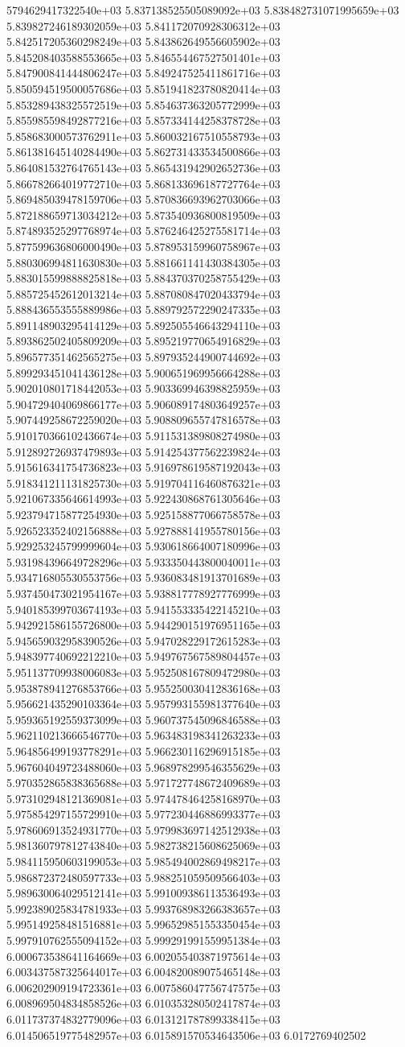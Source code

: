5794629417322540e+03	5.837138525505089092e+03	5.838482731071995659e+03	5.839827246189302059e+03	5.841172070928306312e+03	5.842517205360298249e+03	5.843862649556605902e+03	5.845208403588553665e+03	5.846554467527501401e+03	5.847900841444806247e+03	5.849247525411861716e+03	5.850594519500057686e+03	5.851941823780820414e+03	5.853289438325572519e+03	5.854637363205772999e+03	5.855985598492877216e+03	5.857334144258378728e+03	5.858683000573762911e+03	5.860032167510558793e+03	5.861381645140284490e+03	5.862731433534500866e+03	5.864081532764765143e+03	5.865431942902652736e+03	5.866782664019772710e+03	5.868133696187727764e+03	5.869485039478159706e+03	5.870836693962703066e+03	5.872188659713034212e+03	5.873540936800819509e+03	5.874893525297768974e+03	5.876246425275581714e+03	5.877599636806000490e+03	5.878953159960758967e+03	5.880306994811630830e+03	5.881661141430384305e+03	5.883015599888825818e+03	5.884370370258755429e+03	5.885725452612013214e+03	5.887080847020433794e+03	5.888436553555889986e+03	5.889792572290247335e+03	5.891148903295414129e+03	5.892505546643294110e+03	5.893862502405809209e+03	5.895219770654916829e+03	5.896577351462565275e+03	5.897935244900744692e+03	5.899293451041436128e+03	5.900651969956664288e+03	5.902010801718442053e+03	5.903369946398825959e+03	5.904729404069866177e+03	5.906089174803649257e+03	5.907449258672259020e+03	5.908809655747816578e+03	5.910170366102436674e+03	5.911531389808274980e+03	5.912892726937479893e+03	5.914254377562239824e+03	5.915616341754736823e+03	5.916978619587192043e+03	5.918341211131825730e+03	5.919704116460876321e+03	5.921067335646614993e+03	5.922430868761305646e+03	5.923794715877254930e+03	5.925158877066758578e+03	5.926523352402156888e+03	5.927888141955780156e+03	5.929253245799999604e+03	5.930618664007180996e+03	5.931984396649728296e+03	5.933350443800040011e+03	5.934716805530553756e+03	5.936083481913701689e+03	5.937450473021954167e+03	5.938817778927776999e+03	5.940185399703674193e+03	5.941553335422145210e+03	5.942921586155726800e+03	5.944290151976951165e+03	5.945659032958390526e+03	5.947028229172615283e+03	5.948397740692212210e+03	5.949767567589804457e+03	5.951137709938006083e+03	5.952508167809472980e+03	5.953878941276853766e+03	5.955250030412836168e+03	5.956621435290103364e+03	5.957993155981377640e+03	5.959365192559373099e+03	5.960737545096846588e+03	5.962110213666546770e+03	5.963483198341263233e+03	5.964856499193778291e+03	5.966230116296915185e+03	5.967604049723488060e+03	5.968978299546355629e+03	5.970352865838365688e+03	5.971727748672409689e+03	5.973102948121369081e+03	5.974478464258168970e+03	5.975854297155729910e+03	5.977230446886993377e+03	5.978606913524931770e+03	5.979983697142512938e+03	5.981360797812743840e+03	5.982738215608625069e+03	5.984115950603199053e+03	5.985494002869498217e+03	5.986872372480597733e+03	5.988251059509566403e+03	5.989630064029512141e+03	5.991009386113536493e+03	5.992389025834781933e+03	5.993768983266383657e+03	5.995149258481516881e+03	5.996529851553350454e+03	5.997910762555094152e+03	5.999291991559951384e+03	6.000673538641164669e+03	6.002055403871975614e+03	6.003437587325644017e+03	6.004820089075465148e+03	6.006202909194723361e+03	6.007586047756747575e+03	6.008969504834858526e+03	6.010353280502417874e+03	6.011737374832779096e+03	6.013121787899338415e+03	6.014506519775482957e+03	6.015891570534643506e+03	6.0172769402502